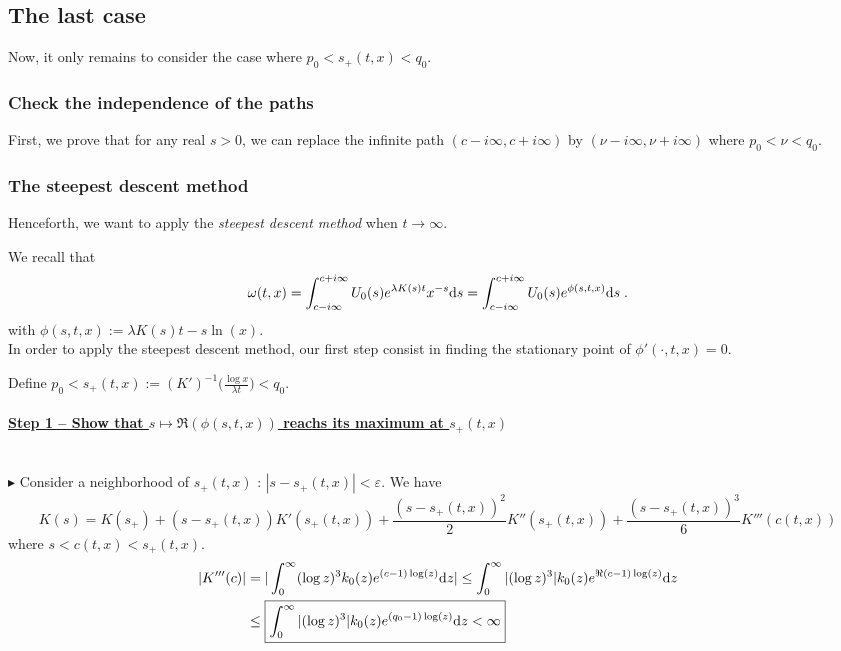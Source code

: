 \documentclass[11pt]{amsart}
\newcommand{\ul}[1]{\underline{#1}}
\begin{document}
\subsection{The last case}

Now, it only remains to consider the case where $p_0 < s_+(t,x) < q_0$.

\subsubsection{Check the independence of the paths}

First, we prove that for any real $s > 0$, we can replace the infinite path $(c - i \infty, c + i \infty)$ by $(\nu - i \infty, \nu + i \infty)$ where $ p_0 < \nu < q_0$.

\subsubsection{The steepest descent method}

Henceforth, we want to apply the \textit{steepest descent method} \cite{debye1909naherungsformeln} when $t \to \infty$.

We recall that 
    \begin{equation*}
        \omega(t,x)
        = \int_{c-i\infty}^{c+i\infty} U_0(s) e^{\lambda K(s)t}x^{-s} \mathrm ds
        =  \int_{c-i\infty}^{c+i\infty} U_0(s) e^{\phi(s, t, x)} \mathrm ds
        \; .
    \end{equation*}
with $\phi(s,t,x) := \lambda K(s) t - s \ln(x) $.\\

In order to apply the steepest descent method, our first step consist in finding the stationary point of $\phi'(\cdot, t, x) = 0$. 

Define $p_0 < s_+(t,x) := (K')^{-1} \Big( \frac{\log x}{\lambda t} \Big) < q_0$.

\paragraph{\ul{Step 1 -- Show that $s \mapsto \Re(\phi(s, t, x))$ reachs its maximum at $s_+(t, x)$}} \text{}\\

$\blacktriangleright$ Consider a neighborhood of $s_+(t,x)$ : $|s - s_+(t,x)| < \varepsilon$. We have
\begin{equation}
    K(s) = K(s_+) + (s - s_+(t,x)) K'(s_+(t,x)) + \frac{(s - s_+(t,x))^2}{2} K''(s_+(t,x)) + \frac{(s - s_+(t,x))^3}{6} K'''(c(t,x))
\end{equation}
where $s < c(t,x) < s_+(t,x)$.
    \begin{align*}
         |K'''(c)|
         &= |\int_0^\infty (\log z)^3 k_0(z) e^{(c-1)\log(z)}\mathrm dz|
         \leq \int_0^\infty |(\log z)^3| k_0(z)  e^{\Re (c-1)\log(z)}\mathrm dz \\
         &\leq  \boxed{\int_0^\infty |(\log z)^3| k_0(z)  e^{(q_0-1)\log(z)}\mathrm dz < \infty}
    \end{align*}
    
\end{document}
